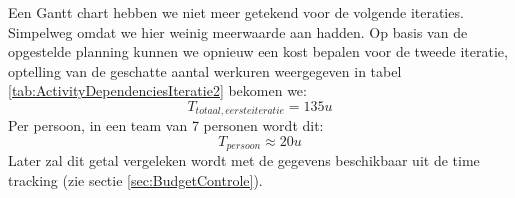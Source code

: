 Een Gantt chart hebben we niet meer getekend voor de volgende iteraties. Simpelweg omdat we hier weinig meerwaarde aan hadden. Op basis van de opgestelde planning kunnen we opnieuw een kost bepalen voor de tweede iteratie, optelling van de geschatte aantal werkuren weergegeven in tabel \ref{tab:ActivityDependenciesIteratie2} bekomen we:
\begin{equation*}
	T_{totaal, eerste iteratie} = 135u
\end{equation*} 
Per persoon, in een team van 7 personen wordt dit:
\begin{equation*}
	T_{persoon} \approx 20u
\end{equation*}
Later zal dit getal vergeleken wordt met de gegevens beschikbaar uit de time tracking (zie sectie \ref{sec:BudgetControle}).


